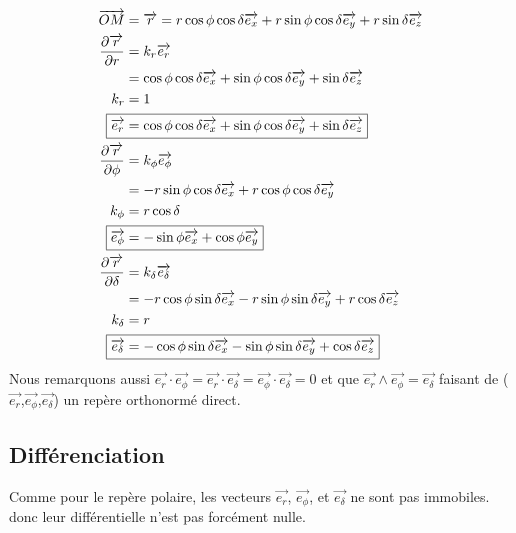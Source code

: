 \documentclass{report}
\begin{document}
\begin{align*}
\overrightarrow{OM}&=\overrightarrow r= r\cos\phi\cos\delta\overrightarrow{e_x}+r\sin\phi\cos\delta\overrightarrow{e_y}+r\sin\delta\overrightarrow{e_z}\\
\frac{\partial\overrightarrow{r}}{\partial r}&=k_r\overrightarrow{e_r}\\
&=\cos\phi\cos\delta\overrightarrow{e_x}+\sin\phi\cos\delta\overrightarrow{e_y}+\sin\delta\overrightarrow{e_z}\\
k_r&=1\\
\Aboxed{\overrightarrow{e_r}&=\cos\phi\cos\delta\overrightarrow{e_x}+\sin\phi\cos\delta\overrightarrow{e_y}+\sin\delta\overrightarrow{e_z}}\\
\frac{\partial\overrightarrow{r}}{\partial\phi}&=k_\phi\overrightarrow{e_\phi}\\
&=-r\sin\phi\cos\delta\overrightarrow{e_x}+r\cos\phi\cos\delta\overrightarrow{e_y}\\
k_\phi&=r\cos\delta\\
\Aboxed{\overrightarrow{e_\phi}&=-\sin\phi\overrightarrow{e_x}+\cos\phi\overrightarrow{e_y}}\\
\frac{\partial\overrightarrow{r}}{\partial\delta}&=k_\delta\overrightarrow{e_\delta}\\
&=-r\cos\phi\sin\delta\overrightarrow{e_x}-r\sin\phi\sin\delta\overrightarrow{e_y}+r\cos\delta\overrightarrow{e_z}\\
k_\delta&=r\\
\Aboxed{\overrightarrow{e_\delta}&=-\cos\phi\sin\delta\overrightarrow{e_x}-\sin\phi\sin\delta\overrightarrow{e_y}+\cos\delta\overrightarrow{e_z}}\\
\end{align*}
\clearpage
Nous remarquons aussi $\overrightarrow{e_r}\cdot\overrightarrow{e_\phi}=\overrightarrow{e_r}\cdot\overrightarrow{e_\delta}=\overrightarrow{e_\phi}\cdot\overrightarrow{e_\delta}=0$ et que $\overrightarrow{e_r}\wedge\overrightarrow{e_\phi}=\overrightarrow{e_\delta}$ faisant de ($\overrightarrow{e_r}$,$\overrightarrow{e_\phi}$,$\overrightarrow{e_\delta}$) un repère orthonormé direct.

\subsection{Différenciation}
Comme pour le repère polaire, les vecteurs $\overrightarrow{e_r}$, $\overrightarrow{e_\phi}$, et $\overrightarrow{e_\delta}$ ne sont pas immobiles. donc leur différentielle n'est pas forcément nulle.
\end{document}
